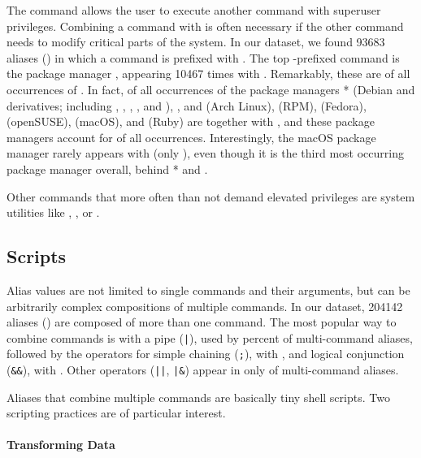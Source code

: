 The  command allows the user to execute another command with superuser privileges.
Combining a command with  is often necessary if the other command needs to modify critical parts of the system.
In our dataset, we found \num{93683} aliases () in which a command is prefixed with .
The top -prefixed command is the package manager , appearing \num{10467} times with .
Remarkably, these are  of all occurrences of .
In fact,  of all occurrences of the package managers * (Debian and derivatives; including , , , , and ), ,  and  (Arch Linux),  (RPM),  (Fedora),  (openSUSE),  (macOS), and  (Ruby) are together with , and these package managers account for  of all  occurrences.
Interestingly, the macOS package manager  rarely appears with  (only ), even though it is the third most occurring package manager overall, behind * and .

Other commands that more often than not demand elevated privileges are system utilities like , ,  or .

\subsection{Scripts}

Alias values are not limited to single commands and their arguments, but can be arbitrarily complex compositions of multiple commands.
In our dataset, \num{204142} aliases () are composed of more than one command.
The most popular way to combine commands is with a pipe (\verb`|`), used by  percent of multi-command aliases, followed by the operators for simple chaining (\verb|;|), with , and logical conjunction (\verb|&&|), with .
Other operators (\verb`||`, \verb`|&`) appear in only  of multi-command aliases.

Aliases that combine multiple commands are basically tiny shell scripts.
Two scripting practices are of particular interest.

\paragraph{\bf Transforming Data}

